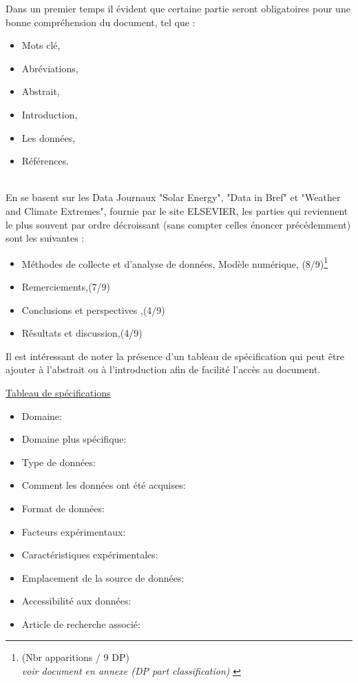 \documentclass[11pt,oneside]{article}
\begin{document}
Dans un premier temps il évident que certaine partie seront obligatoires pour une bonne compréhension du document, tel que :\\
\begin{itemize}
\item Mots clé,
\item Abréviations,
\item Abstrait,
\item Introduction,
\item Les données,
\item Références.
\end{itemize}
\phantom{aaaaaaaaaaaaaaaaaaaaaaaaaaaaaaaaaaaaaaa
ytrfdytfugvghikuhjbiujbhaaaaaaaaaaaaaaa}\\
\indent En se basent sur les Data Journaux "Solar Energy", "Data in Bref" et "Weather and Climate Extremes", fournie par le site ELSEVIER, les parties qui reviennent le plus souvent par  ordre décroissant (sans compter celles énoncer précédemment) sont les suivantes :\\
\begin{itemize}
\item Méthodes de collecte et d'analyse de données, Modèle numérique, (8/9)\footnote{(Nbr apparitions / 9 DP)\\
{\small \textit{voir document en annexe (DP part classification) }}}
\item Remerciements,(7/9)
\item Conclusions et perspectives ,(4/9)
\item Résultats et discussion,(4/9)
\end{itemize}

Il est intéressant de noter la présence d'un tableau de spécification qui peut être ajouter à l'abstrait ou à l'introduction afin de facilité l'accès au document.

\underline {Tableau de spécifications}\\
\begin{itemize}
\item Domaine:
\item Domaine plus spécifique:
\item Type de données:
\item Comment les données ont été acquises:
\item Format de données:
\item Facteurs expérimentaux:
\item Caractéristiques expérimentales:
\item Emplacement de la source de données:
\item Accessibilité aux données:
\item Article de recherche associé:
\end{itemize}
\end{document}
